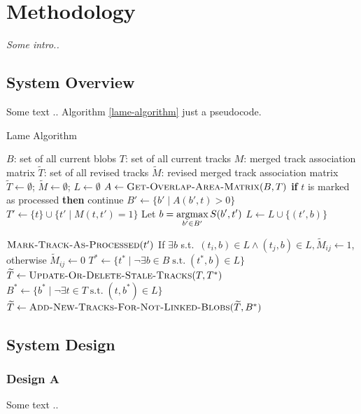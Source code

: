 \setlength{\footskip}{8mm}

\chapter{Methodology}
\label{ch:methodology}

\textit{Some intro..}

\section{System Overview}

Some text .. Algorithm \ref{lame-algorithm} just a pseudocode.  

\renewcommand{\algorithmicrequire}{\textbf{Input:}}
\renewcommand{\algorithmicensure}{\textbf{Output:}}
\renewcommand{\algorithmicforall}{\textbf{for each}}
\begin{algorithm}
\caption{Lame Algorithm}
\label{lame-algorithm}
\begin{algorithmic}
  \REQUIRE $B$: set of all current blobs
  \REQUIRE $T$: set of all current tracks
  \REQUIRE $M$: merged track association matrix
  \ENSURE $\widetilde{T}$: set of all revised tracks
  \ENSURE $\widetilde{M}$: revised merged track association matrix
  \STATE $\widetilde{T} \gets \emptyset$; $\widetilde{M} \gets \emptyset$; $L \gets \emptyset$
  \STATE $A \gets \textsc{Get-Overlap-Area-Matrix}(B, T)$
    \STATE \textbf{if} $t$ is marked as processed \textbf{then} continue
    \STATE $B' \gets \{ b' \mid A(b', t) > 0 \}$ 
    \STATE $T' \gets \{ t \} \cup \{ t' \mid M(t, t') = 1 \}$ 
        \STATE Let $b = \displaystyle\operatorname*{argmax}_{b' \in B'} S(b', t')$
	\STATE $L \gets L \cup \{ (t', b) \}$

	\STATE $\textsc{Mark-Track-As-Processed}(t')$
      \ENDFOR
    \ENDIF
  \ENDFOR
    \STATE If $\exists b$ s.t.\ $(t_i, b) \in L \wedge (t_j, b) \in L, \widetilde{M}_{ij} \gets 1$, otherwise $\widetilde{M}_{ij} \gets 0$
  \ENDFOR
  \STATE $T^* \gets \{ t^* \mid \neg\exists b \in B \;\text{s.t.}\; (t^*,b) \in L \}$ 
  \STATE $\widetilde{T} \gets \textsc{Update-Or-Delete-Stale-Tracks}(T,T^*)$
  \STATE $B^* \gets \{ b^* \mid \neg \exists t \in T \;\text{s.t.}\; (t, b^*) \in L \}$ 
  \STATE $\widetilde{T} \gets\textsc{Add-New-Tracks-For-Not-Linked-Blobs}(\widetilde{T},B^*)$
\end{algorithmic}
\end{algorithm}

\section{System Design}

\subsection{Design A}

Some text ..

\FloatBarrier


